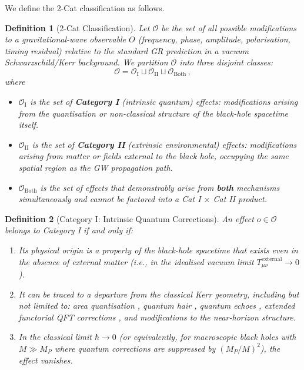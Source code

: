 \documentclass[11pt]{article}
\newtheorem{definition}{Definition}[section]
\begin{document}
We define the 2-Cat classification as follows.

\begin{definition}[2-Cat Classification]\label{def:2cat}
Let $\mathcal{O}$ be the set of all possible modifications to a gravitational-wave observable $O$ (frequency, phase, amplitude, polarisation, timing residual) relative to the standard GR prediction in a vacuum Schwarzschild/Kerr background. We partition $\mathcal{O}$ into three disjoint classes:
\begin{equation}
\mathcal{O} = \mathcal{O}_{\mathrm{I}} \sqcup \mathcal{O}_{\mathrm{II}} \sqcup \mathcal{O}_{\mathrm{Both}}\,,
\end{equation}
where
\begin{itemize}
\item $\mathcal{O}_{\mathrm{I}}$ is the set of \textbf{Category I} (intrinsic quantum) effects: modifications arising from the quantisation or non-classical structure of the black-hole spacetime itself.
\item $\mathcal{O}_{\mathrm{II}}$ is the set of \textbf{Category II} (extrinsic environmental) effects: modifications arising from matter or fields external to the black hole, occupying the same spatial region as the GW propagation path.
\item $\mathcal{O}_{\mathrm{Both}}$ is the set of effects that demonstrably arise from \textbf{both} mechanisms simultaneously and cannot be factored into a Cat I $\times$ Cat II product.
\end{itemize}
\end{definition}

\begin{definition}[Category I: Intrinsic Quantum Corrections]\label{def:catI}
An effect $o \in \mathcal{O}$ belongs to Category I if and only if:
\begin{enumerate}
\item Its physical origin is a property of the black-hole spacetime that exists even in the absence of external matter (i.e., in the idealised vacuum limit $T_{\mu\nu}^{\mathrm{external}} \to 0$).
\item It can be traced to a departure from the classical Kerr geometry, including but not limited to: area quantisation \cite{Bekenstein:1994,Mukhanov:1996}, quantum hair \cite{Haggard:2014}, quantum echoes \cite{Cardoso:2016vtg}, extended functorial QFT corrections \cite{Brunetti:2003}, and modifications to the near-horizon structure.
\item In the classical limit $\hbar \to 0$ (or equivalently, for macroscopic black holes with $M \gg M_P$ where quantum corrections are suppressed by $(M_P/M)^2$), the effect vanishes.
\end{enumerate}
\end{definition}
\end{document}
